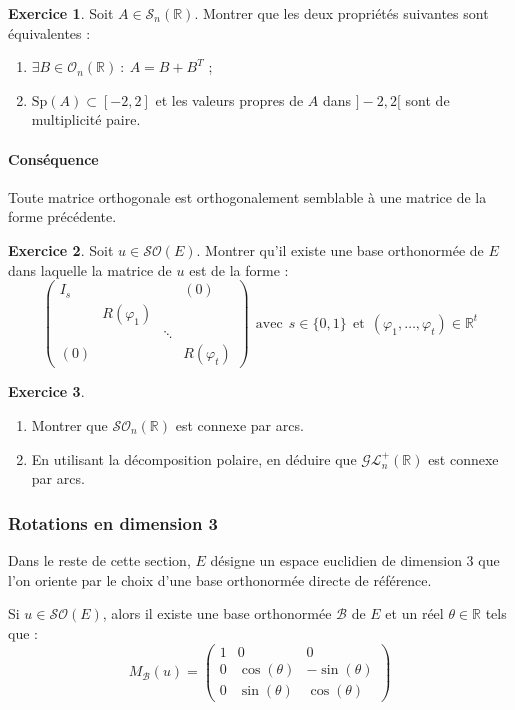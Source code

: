 \documentclass[french]{article}
\newcommand{\R}{\mathbb{R}}
\theoremstyle{plain}
\theoremstyle{definition}
\newtheorem{exo}{Exercice}
\theoremstyle{remark}
\begin{document}
\begin{exo}
	Soit $A\in\mathcal{S}_n(\R)$. Montrer que les deux propriétés suivantes sont équivalentes : 
	\begin{enumerate}[label=(\roman*)]
		\item $\exists B\in\mathcal{O}_n(\R)\ : \ A=B+B^T$ ;
		\item $\text{Sp}(A)\subset[-2,2]$ et les valeurs propres de $A$ dans $]-2,2[$ sont de multiplicité paire.
	\end{enumerate}
\end{exo}

\paragraph{Conséquence} Toute matrice orthogonale est orthogonalement semblable à une matrice de la forme précédente.

\begin{exo}
	Soit $u\in\mathcal{SO}(E)$. Montrer qu'il existe une base orthonormée de $E$ dans laquelle la matrice de $u$ est de la forme : $$\begin{pmatrix}
		I_s&&&(0)\\
		&R(\varphi_1)&&\\
		&&\ddots&\\
		(0)&&&R(\varphi_t)
	\end{pmatrix}\ \ \text{avec}\ \ s\in\{0,1\}\ \ \text{et}\ \ (\varphi_1,\ldots,\varphi_t)\in\R^t$$
\end{exo}

\begin{exo}
	\begin{enumerate}
		\item Montrer que $\mathcal{SO}_n(\R)$ est connexe par arcs. 
		\item En utilisant la décomposition polaire, en déduire que $\mathcal{GL}_n^+(\R)$ est connexe par arcs.
	\end{enumerate}
\end{exo}

\subsubsection*{Rotations en dimension 3}
Dans le reste de cette section, $E$ désigne un espace euclidien de dimension $3$ que l'on oriente par le choix d'une base orthonormée directe de référence.

\begin{thm}{}
	Si $u\in\mathcal{SO}(E)$, alors il existe une base orthonormée $\mathcal{B}$ de $E$ et un réel $\theta\in\R$ tels que : $$M_\mathcal{B}(u)=\begin{pmatrix}
		1&0&0\\
		0&\cos(\theta)&-\sin(\theta)\\
		0&\sin(\theta)&\cos(\theta)
	\end{pmatrix}$$
\end{thm}
\end{document}
